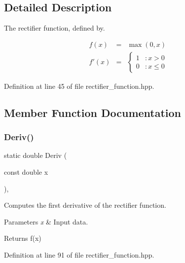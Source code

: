 \subsection{Detailed Description}
The rectifier function, defined by. 

\begin{eqnarray*} f(x) &=& \max(0, x) \\ f'(x) &=& \left\{ \begin{array}{lr} 1 & : x > 0 \\ 0 & : x \le 0 \end{array} \right. \end{eqnarray*} 

Definition at line 45 of file rectifier\+\_\+function.\+hpp.



\subsection{Member Function Documentation}
\mbox{\label{classmlpack_1_1ann_1_1RectifierFunction_acd77fae79f7ba1f4b9a21e07a261e537}} 
\subsubsection{Deriv()\hspace{0.1cm}{\footnotesize\ttfamily [1/2]}}
{\footnotesize\ttfamily static double Deriv (\begin{DoxyParamCaption}\item[{const double}]{x }\end{DoxyParamCaption})\hspace{0.3cm}{\ttfamily [inline]}, {\ttfamily [static]}}



Computes the first derivative of the rectifier function. 


\begin{DoxyParams}{Parameters}
{\em x} & Input data. \\
\hline
\end{DoxyParams}
\begin{DoxyReturn}{Returns}
f\textquotesingle{}(x) 
\end{DoxyReturn}


Definition at line 91 of file rectifier\+\_\+function.\+hpp.



